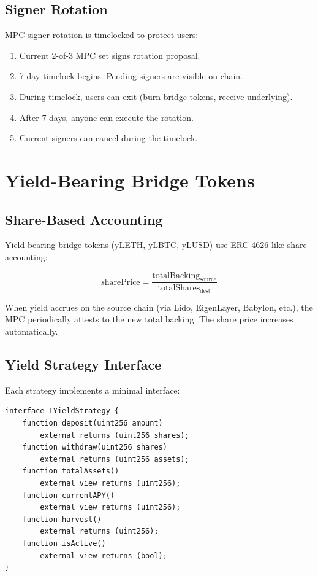 \documentclass[11pt,twocolumn]{article}
\begin{document}
\subsection{Signer Rotation}

MPC signer rotation is timelocked to protect users:

\begin{enumerate}[nosep]
  \item Current 2-of-3 MPC set signs rotation proposal.
  \item 7-day timelock begins. Pending signers are visible on-chain.
  \item During timelock, users can exit (burn bridge tokens, receive underlying).
  \item After 7 days, anyone can execute the rotation.
  \item Current signers can cancel during the timelock.
\end{enumerate}

\section{Yield-Bearing Bridge Tokens}

\subsection{Share-Based Accounting}

Yield-bearing bridge tokens (yLETH, yLBTC, yLUSD) use ERC-4626-like share accounting:

\begin{equation}
  \text{sharePrice} = \frac{\text{totalBacking}_{\text{source}}}{\text{totalShares}_{\text{dest}}}
\end{equation}

When yield accrues on the source chain (via Lido, EigenLayer, Babylon, etc.), the MPC periodically attests to the new total backing. The share price increases automatically.

\subsection{Yield Strategy Interface}

Each strategy implements a minimal interface:

\begin{lstlisting}[language=Solidity,caption=IYieldStrategy interface]
interface IYieldStrategy {
    function deposit(uint256 amount)
        external returns (uint256 shares);
    function withdraw(uint256 shares)
        external returns (uint256 assets);
    function totalAssets()
        external view returns (uint256);
    function currentAPY()
        external view returns (uint256);
    function harvest()
        external returns (uint256);
    function isActive()
        external view returns (bool);
}
\end{lstlisting}
\end{document}
